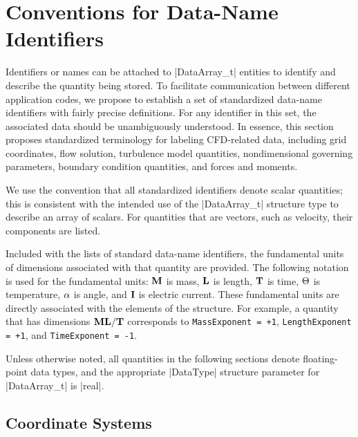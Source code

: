 \section{Conventions for Data-Name Identifiers} 
\label{s:dataname}
\thispagestyle{plain}

Identifiers or names can be attached to |DataArray_t| entities to
identify and describe the quantity being stored.  To facilitate
communication between different application codes, we propose to
establish a set of standardized data-name identifiers with fairly
precise definitions.  For any identifier in this set, the associated
data should be unambiguously understood.  In essence, this section
proposes standardized terminology for labeling CFD-related data,
including grid coordinates, flow solution, turbulence model quantities,
nondimensional governing parameters, boundary condition quantities, and
forces and moments.

We use the convention that all standardized identifiers denote
scalar quantities; this is consistent with the intended use of the
|DataArray_t| structure type to describe an array of scalars.  For
quantities that are vectors, such as velocity, their components are
listed.

Included with the lists of standard data-name identifiers, the
fundamental units of dimensions associated with that quantity are
provided.
The following notation is used for the fundamental units: ${\bf M}$ is mass,
${\bf L}$ is length, ${\bf T}$ is time, ${\Theta}$ is temperature, ${\alpha}$ is angle, and
${\bf I}$ is electric current.
These fundamental units are directly associated with the elements of the
 structure.
For example, a quantity that has dimensions ${\bf M}{\bf L}/{\bf T}$ corresponds to
\texttt{MassExponent = +1},
\texttt{LengthExponent = +1}, and
\texttt{TimeExponent = -1}.

Unless otherwise noted, all
quantities in the following sections denote floating-point data
types, and the appropriate |DataType| structure parameter for
|DataArray_t| is |real|.

\subsection{Coordinate Systems}
\label{s:dataname_grid}

